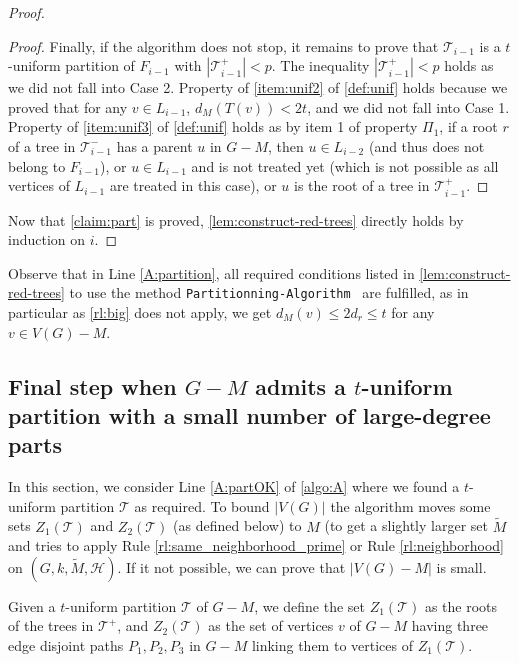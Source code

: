 \documentclass{amsart}
\newcommand{\algopart }{\texttt{Partitionning-Algorithm}~ }
\newcommand{\mT}{\mathcal{T}}
\newcommand{\mH}{\mathcal{H}}
\newcommand{\ruleref}[1]{\hyperref[#1]{\ref*{#1}}}
\begin{document}
\begin{proof}
\begin{proof}
Finally, if the algorithm does not stop, it remains to prove that
$\mT_{i-1}$ is a $t$-uniform partition of $F_{i-1}$ with $|\mT_{i-1}^+| < p$.
The inequality $|\mT_{i-1}^+| < p$ holds as we did not fall into Case 2. Property of \autoref{item:unif2} of \autoref{def:unif} holds because we proved that for any $v \in L_{i-1}$, $d_M(T(v)) < 2t$, and we did not fall into Case 1. 
Property of \autoref{item:unif3} of \autoref{def:unif} holds as by item 1 of property $\Pi_1$, if a root $r$ of a tree in $\mT_{i-1}^-$ has a parent $u$ in $G-M$, then $u  \in L_{i-2}$ (and thus does not belong to $F_{i-1}$), or $u \in L_{i-1}$ and is not treated yet (which is not possible as all vertices of $L_{i-1}$ are treated in this case), or $u$ is the root of a tree in  $\mT_{i-1}^+$. 
\end{proof}

Now that  \autoref{claim:part} is proved, \autoref{lem:construct-red-trees} directly holds by induction on $i$.
\end{proof}

\begin{remark}
Observe that in Line \ref{A:partition}, all required conditions listed in \autoref{lem:construct-red-trees} to use the method \algopart are fulfilled, as in particular as \ruleref{rl:big} does not apply, we get $d_M(v) \le 2d_r \le t$ for any $v \in V(G)-M$.
\end{remark}


\subsection{Final step when \texorpdfstring{$G-M$}{G-M} admits a \texorpdfstring{$t$}{t}-uniform partition with a small number of large-degree parts}\label{ssec:step4}


In this section, we consider Line \ref{A:partOK} of \autoref{algo:A} where we found a $t$-uniform partition $\mT$ as required. To bound $|V(G)|$ the algorithm moves some sets $Z_1(\mT)$ and $Z_2(\mT)$ (as defined below) to $M$ (to get a slightly larger set $\tilde{M}$ and tries to apply Rule \ruleref{rl:same_neighborhood_prime} or Rule \ruleref{rl:neighborhood} on $(G,k,\tilde{M},\mH)$.
If it not possible, we can prove that $|V(G)-M|$ is small.


\begin{definition}\label{def:Z}
    Given a $t$-uniform partition $\mT$ of $G-M$, we define the set $Z_1(\mT)$ as the roots of the trees in $\mT^+$, and $Z_2(\mT)$ as the set of vertices $v$ of $G - M$ having three edge disjoint paths $P_1,P_2,P_3$ in $G- M$ linking them to vertices of $Z_1(\mT)$.
\end{definition}
\end{document}
